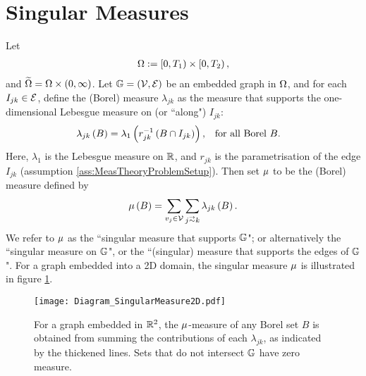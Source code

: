 \section{Singular Measures} \label{sec:SingularMeasures}

Let 
\begin{align*}
	\Omega:= \left[0,T_1\right)\times\left[0,T_2\right), 
\end{align*}
and $\widetilde{\Omega} = \Omega \times \left( 0,\infty \right)$.
Let $\mathbb{G} = \left( \mathcal{V},\mathcal{E} \right)$ be an embedded graph in $\Omega$, and for each $I_{jk}\in \mathcal{E}$, define the (Borel) measure $\lambda_{jk}$ as the measure that supports the one-dimensional Lebesgue measure on (or ``along") $I_{jk}$:
\begin{align*}
	\lambda_{jk}\left( B \right) = \lambda_{1}\left( r_{jk}^{-1}\left( B \cap I_{jk} \right) \right),
	&\quad\text{for all Borel } B.
\end{align*}
Here, $\lambda_1$ is the Lebesgue measure on $\mathbb{R}$, and $r_{jk}$ is the parametrisation of the edge $I_{jk}$ (assumption \ref{ass:MeasTheoryProblemSetup}).
Then set $\mu$ to be the (Borel) measure defined by
\begin{align*}
	\ddmes\bracs{B} = \sum_{v_j\in \vertSet}\sum_{j\conLeft k} \lambda_{jk}\bracs{B}.
\end{align*}
We refer to $\mu$ as the ``singular measure that supports $\mathbb{G}$"; or alternatively the ``singular measure on $\mathbb{G}$", or the ``(singular) measure that supports the edges of $\mathbb{G}$".
For a graph embedded into a 2D domain, the singular measure $\mu$ is illustrated in figure \ref{fig:Diagram_SingularMeasure2D}.
\begin{figure}[b!]
	\centering
	\texttt{[image: Diagram\_SingularMeasure2D.pdf]}
	\caption{\label{fig:Diagram_SingularMeasure2D} For a graph embedded in $\mathbb{R}^2$, the $\mu$-measure of any Borel set $B$ is obtained from summing the contributions of each $\lambda_{jk}$, as indicated by the thickened lines.
	Sets that do not intersect $\mathbb{G}$ have zero measure.}
\end{figure}

